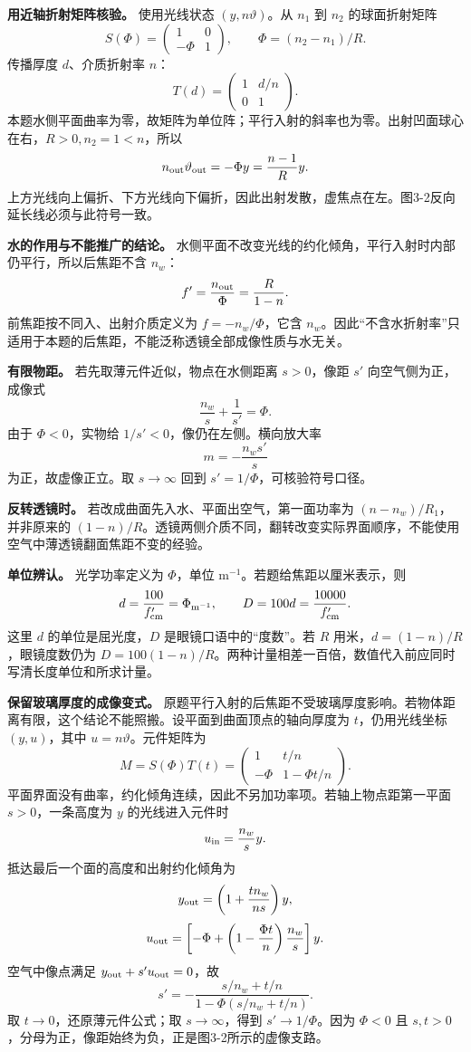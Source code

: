\documentclass[12pt,a4paper,UTF8]{ctexart}
\begin{document}
\textbf{用近轴折射矩阵核验。} 使用光线状态 \((y,n\vartheta)\)。从
\(n_1\) 到 \(n_2\) 的球面折射矩阵 \[
S(\Phi)=\begin{pmatrix}1&0\\-\Phi&1\end{pmatrix},
\qquad \Phi=(n_2-n_1)/R.
\] 传播厚度 \(d\)、介质折射率 \(n\)： \[
T(d)=\begin{pmatrix}1&d/n\\0&1\end{pmatrix}.
\]
本题水侧平面曲率为零，故矩阵为单位阵；平行入射的斜率也为零。出射凹面球心在右，\(R>0,n_2=1<n\)，所以
\[
n_{\rm out}\vartheta_{\rm out}=-\Phi y
=\frac{n-1}{R}y.
\]
上方光线向上偏折、下方光线向下偏折，因此出射发散，虚焦点在左。图3-2反向延长线必须与此符号一致。

\textbf{水的作用与不能推广的结论。}
水侧平面不改变光线的约化倾角，平行入射时内部仍平行，所以后焦距不含
\(n_w\)： \[
f'=\frac{n_{\rm out}}{\Phi}=\frac{R}{1-n}.
\] 前焦距按不同入、出射介质定义为 \(f=-n_w/\Phi\)，它含
\(n_w\)。因此``不含水折射率''只适用于本题的后焦距，不能泛称透镜全部成像性质与水无关。

\textbf{有限物距。} 若先取薄元件近似，物点在水侧距离 \(s>0\)，像距
\(s'\) 向空气侧为正，成像式 \[
\frac{n_w}{s}+\frac1{s'}=\Phi.
\] 由于 \(\Phi<0\)，实物给 \(1/s'<0\)，像仍在左侧。横向放大率 \[
m=-\frac{n_w s'}s
\] 为正，故虚像正立。取 \(s\to\infty\) 回到
\(s'=1/\Phi\)，可核验符号口径。

\textbf{反转透镜时。} 若改成曲面先入水、平面出空气，第一面功率为
\((n-n_w)/R_1\)，并非原来的
\((1-n)/R\)。透镜两侧介质不同，翻转改变实际界面顺序，不能使用空气中薄透镜翻面焦距不变的经验。

\textbf{单位辨认。} 光学功率定义为 \(\Phi\)，单位
\(\mathrm{m^{-1}}\)。若题给焦距以厘米表示，则 \[
d=\frac{100}{f'_{\rm cm}}=\Phi_{\rm m^{-1}},\qquad
D=100d=\frac{10000}{f'_{\rm cm}}.
\] 这里 \(d\) 的单位是屈光度，\(D\) 是眼镜口语中的``度数''。若 \(R\)
用米，\(d=(1-n)/R\)，眼镜度数仍为
\(D=100(1-n)/R\)。两种计量相差一百倍，数值代入前应同时写清长度单位和所求计量。

\textbf{保留玻璃厚度的成像变式。}
原题平行入射的后焦距不受玻璃厚度影响。若物体距离有限，这个结论不能照搬。设平面到曲面顶点的轴向厚度为
\(t\)，仍用光线坐标 \((y,u)\)，其中 \(u=n\vartheta\)。元件矩阵为 \[
M=S(\Phi)T(t)=
\begin{pmatrix}
1&t/n\\
-\Phi&1-\Phi t/n
\end{pmatrix}.
\]
平面界面没有曲率，约化倾角连续，因此不另加功率项。若轴上物点距第一平面
\(s>0\)，一条高度为 \(y\) 的光线进入元件时 \[
u_{\rm in}=\frac{n_w}{s}y.
\] 抵达最后一个面的高度和出射约化倾角为 \[
y_{\rm out}=\left(1+\frac{tn_w}{ns}\right)y,
\] \[
u_{\rm out}=\left[-\Phi+
\left(1-\frac{\Phi t}{n}\right)\frac{n_w}s\right]y.
\] 空气中像点满足 \(y_{\rm out}+s'u_{\rm out}=0\)，故 \[
\boxed{s'=
-\frac{s/n_w+t/n}{1-\Phi(s/n_w+t/n)}}.
\] 取 \(t\to0\)，还原薄元件公式；取 \(s\to\infty\)，得到
\(s'\to1/\Phi\)。因为 \(\Phi<0\) 且
\(s,t>0\)，分母为正，像距始终为负，正是图3-2所示的虚像支路。
\end{document}
